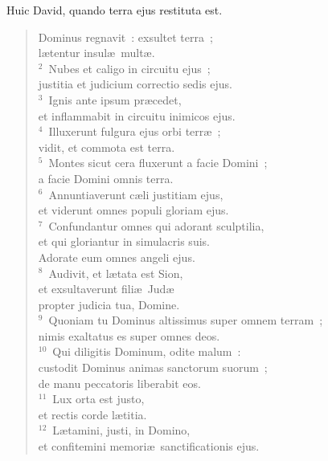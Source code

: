 \bchapter
\lettrine[lines=3,image=true,loversize=0.05,lraise=-0.03]{H}{}uic David, quando terra ejus restituta est. \begin{flushleft}\begin{verse}\vspace{6pt}Dominus regnavit~: exsultet terra~;\\ l\ae tentur insul\ae\ mult\ae .\\
${}^{2}$~Nubes et caligo in circuitu ejus~;\\ justitia et judicium correctio sedis ejus.\\
${}^{3}$~Ignis ante ipsum pr\ae cedet,\\ et inflammabit in circuitu inimicos ejus.\\
${}^{4}$~Illuxerunt fulgura ejus orbi terr\ae~;\\ vidit, et commota est terra.\\
${}^{5}$~Montes sicut cera fluxerunt a facie Domini~;\\ a facie Domini omnis terra.\\
${}^{6}$~Annuntiaverunt c\ae li justitiam ejus,\\ et viderunt omnes populi gloriam ejus.\\
${}^{7}$~Confundantur omnes qui adorant sculptilia,\\ et qui gloriantur in simulacris suis.\\ Adorate eum omnes angeli ejus.\\
${}^{8}$~Audivit, et l\ae tata est Sion,\\ et exsultaverunt fili\ae\ Jud\ae \\ propter judicia tua, Domine.\\
${}^{9}$~Quoniam tu Dominus altissimus super omnem terram~;\\ nimis exaltatus es super omnes deos.\\
${}^{10}$~Qui diligitis Dominum, odite malum~:\\ custodit Dominus animas sanctorum suorum~;\\ de manu peccatoris liberabit eos.\\
${}^{11}$~Lux orta est justo,\\ et rectis corde l\ae titia.\\
${}^{12}$~L\ae tamini, justi, in Domino,\\ et confitemini memori\ae\ sanctificationis ejus.\end{verse}\end{flushleft}



